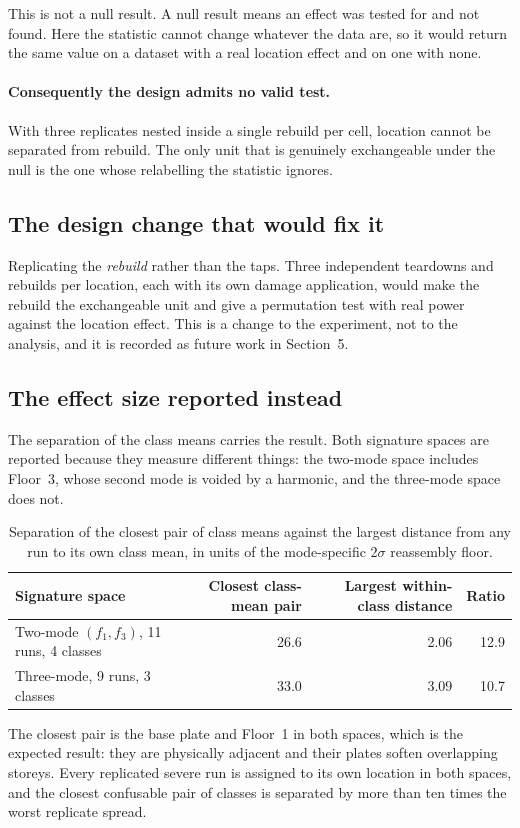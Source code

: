 This is not a null result. A null result means an effect was tested for and not
found. Here the statistic cannot change whatever the data are, so it would
return the same value on a dataset with a real location effect and on one with
none.

\paragraph{Consequently the design admits no valid test.} With three replicates
nested inside a single rebuild per cell, location cannot be separated from
rebuild. The only unit that is genuinely exchangeable under the null is the one
whose relabelling the statistic ignores.

\subsection*{The design change that would fix it}

Replicating the \emph{rebuild} rather than the taps. Three independent teardowns
and rebuilds per location, each with its own damage application, would make the
rebuild the exchangeable unit and give a permutation test with real power against
the location effect. This is a change to the experiment, not to the analysis, and
it is recorded as future work in Section~5.

\subsection*{The effect size reported instead}

The separation of the class means carries the result. Both signature spaces are reported because they measure different things:
the two-mode space includes Floor~3, whose second mode is voided by a harmonic,
and the three-mode space does not.

\begin{table}[htbp]
\centering
\caption{Separation of the closest pair of class means against the largest
distance from any run to its own class mean, in units of the mode-specific
$2\sigma$ reassembly floor.}
\label{tab:perm-effect}
\begin{tabular}{lrrr}
\toprule
Signature space & Closest class-mean pair & Largest within-class distance & Ratio \\
\midrule
Two-mode $(f_1,f_3)$, 11 runs, 4 classes & 26.6 & 2.06 & 12.9 \\
Three-mode, 9 runs, 3 classes            & 33.0 & 3.09 & 10.7 \\
\bottomrule
\end{tabular}
\end{table}

The closest pair is the base plate and Floor~1 in both spaces, which is the
expected result: they are physically adjacent and their plates soften overlapping
storeys. Every replicated severe run is assigned to its own location in both
spaces, and the closest confusable pair of classes is separated by more than ten
times the worst replicate spread.
